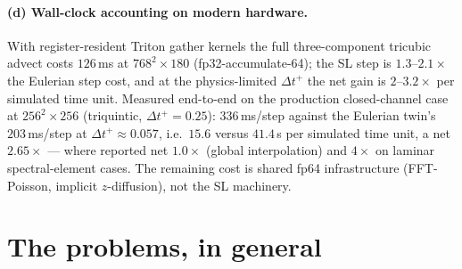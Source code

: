 \documentclass[11pt,a4paper]{article}
\newcommand{\dtp}{\Delta t^{+}}
\begin{document}
\paragraph{(d) Wall-clock accounting on modern hardware.} With
register-resident Triton gather kernels the full three-component tricubic
advect costs $126$\,ms at $768^2\times180$ (fp32-accumulate-64); the SL step
is $1.3$--$2.1\times$ the Eulerian step cost, and at the physics-limited
$\dtp$ the net gain is $2$--$3.2\times$ per simulated time unit. Measured
end-to-end on the production closed-channel case at $256^{2}\times256$
(triquintic, $\dtp=0.25$): $336$\,ms/step against the Eulerian twin's
$203$\,ms/step at $\dtp\approx0.057$, i.e.\ $15.6$ versus $41.4$\,s per
simulated time unit, a net $\mathbf{2.65\times}$ --- where
\cite{xu02} reported net $1.0\times$ (global interpolation) and
\cite{xiu01} $4\times$ on laminar spectral-element cases. The remaining cost
is shared fp64 infrastructure (FFT-Poisson, implicit $z$-diffusion), not the
SL machinery.

\section{The problems, in general}
\end{document}
